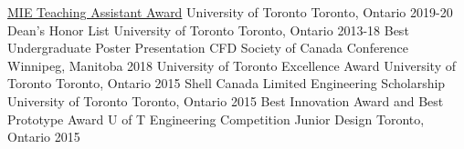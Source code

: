 \begin{cvhonors}
\cvhonor
    {\href{https://www.mie.utoronto.ca/congratulations-2019-20-teaching-assistant-award-winners-lap-tak-chu-richard-hu-behzad-khamidehi-ben-leung-and-khalil-sidawi/}{MIE Teaching Assistant Award}}
    {University of Toronto}
    {Toronto, Ontario}
    {2019-20}
\cvhonor
    {Dean's Honor List}
    {University of Toronto}
    {Toronto, Ontario}
    {2013-18}
\cvhonor
    {Best Undergraduate Poster Presentation}
    {CFD Society of Canada Conference}
    {Winnipeg, Manitoba}
    {2018}  
\cvhonor
    {University of Toronto Excellence Award}
    {University of Toronto}
    {Toronto, Ontario}
    {2015}   
\cvhonor
    {Shell Canada Limited Engineering Scholarship}
    {University of Toronto}
    {Toronto, Ontario}
    {2015}      
\cvhonor
    {Best Innovation Award and Best Prototype Award}
    {U of T Engineering Competition Junior Design}
    {Toronto, Ontario}
    {2015}    
\end{cvhonors}
